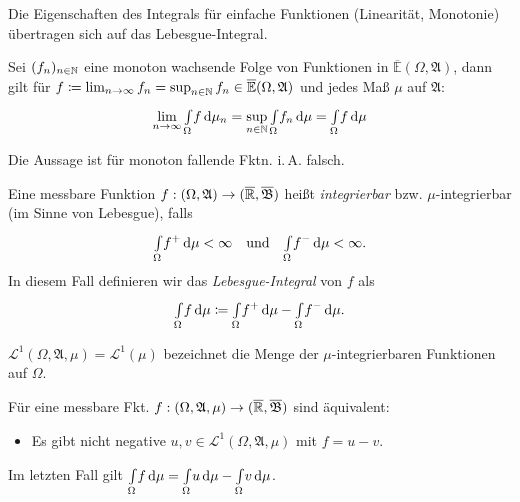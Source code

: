 \documentclass{cheat-sheet}
\newcommand{\Alg}{\mathfrak{A}} %
\newcommand{\Bor}{\mathfrak{B}} %
\newcommand{\E}{\mathbb{E}} %
\newcommand{\Leb}{\mathcal{L}} %
\newcommand{\IntOmu}[1]{\Int{\Omega}{}{#1}{\mu}} %
\begin{document}
\begin{satz}
  Die Eigenschaften des Integrals für einfache Funktionen (Linearität, Monotonie) übertragen sich auf das Lebesgue-Integral.
\end{satz}

\begin{satz}
  Sei $(f_n)_{n \in \mathbb{N}}$ eine monoton wachsende Folge von Funktionen in $\overline{\E}(\Omega, \Alg)$, dann gilt für $f \coloneqq \lim_{n \to \infty} f_n = \sup_{n \in \N} f_n \in \overline{\E}(\Omega, \Alg)$ und jedes Maß $\mu$ auf $\Alg$:
  \[ \lim_{n \to \infty} \IntOmu f_n = \sup_{n \in \N} \IntOmu{f_n} = \IntOmu{f} \]
\end{satz}

\begin{bem}
  Die Aussage ist für monoton fallende Fktn. i.\,A. falsch.
\end{bem}

\begin{defn}
  Eine messbare Funktion $f : (\Omega, \Alg) \to (\ER, \overline{\Bor})$ heißt \emph{integrierbar} bzw. $\mu$-integrierbar (im Sinne von Lebesgue), falls
  \[ \IntOmu{f^+} < \infty \quad \text{und} \quad \IntOmu{f^-} < \infty. \]
  In diesem Fall definieren wir das \emph{Lebesgue-Integral} von $f$ als
  \[ \IntOmu{f} \coloneqq \IntOmu{f^+} - \IntOmu{f^-}. \]
\end{defn}

\begin{nota}
  $\Leb^1(\Omega, \Alg, \mu) = \Leb^1(\mu)$ bezeichnet die Menge der $\mu$-integrierbaren Funktionen auf $\Omega$.
\end{nota}

\begin{satz}
  Für eine messbare Fkt. $f : (\Omega, \Alg, \mu) \to (\ER, \overline{\Bor})$ sind äquivalent:
  \begin{itemize}
    \item Es gibt nicht negative $u, v \in \Leb^1(\Omega, \Alg, \mu)$ mit $f = u - v$.
  \end{itemize}
  Im letzten Fall gilt $\IntOmu{f} = \IntOmu{u} - \IntOmu{v}$.
\end{satz}
\end{document}

